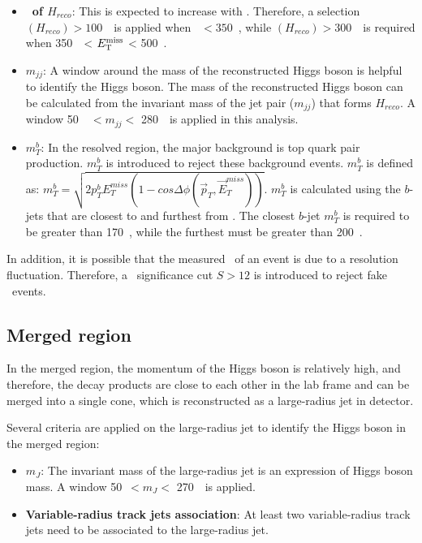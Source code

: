 \begin{itemize}
    \item \textbf{\pt~of $H_{reco}$}: This is expected to increase with \met. Therefore, a selection \pt$(H_{reco})>100$~\GeV~is applied when \met~$<350$~\GeV, while \pt$(H_{reco})>300$~\GeV~is required when 
        350~\GeV~< $E_{\mathrm{T}}^{\mathrm{miss}}$ < 500~\GeV.
    \item \textbf{$m_{jj}$}: A window around the mass of the reconstructed Higgs boson is helpful to identify the Higgs boson. The mass of the reconstructed Higgs boson can be calculated from the invariant mass of the jet pair ($m_{jj}$) that forms $H_{reco}$. A window 50~\GeV~$<m_{jj}<$ 280~\GeV~is applied in this analysis. 
    \item \textbf{$m_{T}^{b}$}: In the resolved region, the major background is top quark pair production. $m_{T}^{b}$ is introduced to reject these background events. $m_{T}^{b}$ is defined as: $m_{T}^{b}=\sqrt{2p_{T}^{b}E_{T}^{miss}(1-cos\Delta\phi(\vec{p}_{T}, \vec{E}_{T}^{miss}))}$. $m_{T}^{b}$ is calculated using the $b$-jets that are closest to and furthest from \met. The closest $b$-jet $m_{T}^b$ is required to be greater than 170~\GeV, while the furthest must be greater than 200~\GeV.
\end{itemize}

\par In addition, it is possible that the measured \met~of an event is due to a resolution fluctuation. Therefore, a \met~significance cut $S>12$ is introduced to reject fake \met~events.

\subsection{Merged region}

\par In the merged region, the momentum of the Higgs boson is relatively high, and therefore, the decay products are close to each other in the lab frame and can be merged into a single cone, which is reconstructed as a large-radius jet in detector.
\par Several criteria are applied on the large-radius jet to identify the Higgs boson in the merged region:
\begin{itemize}
    \item \textbf{$m_{J}$}: The invariant mass of the large-radius jet is an expression of Higgs boson mass. A window 50~\GeV$ < m_{J} <$ 270~\GeV~is applied.
    \item \textbf{Variable-radius track jets association}: At least two variable-radius track jets need to be associated to the large-radius jet.
\end{itemize}

